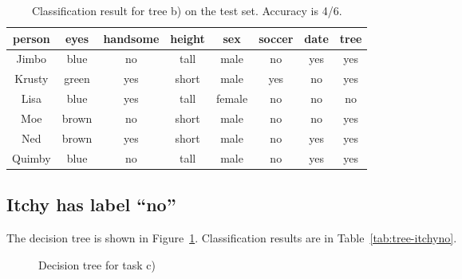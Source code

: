 \begin{table}[h!]
  \centering
  \begin{tabular}{cccccc|c|c}
    \toprule
    person      & eyes  & handsome & height & sex    & soccer & date & tree\\
    \midrule
    Jimbo       & blue  & no       & tall   & male   & no     & yes & yes\\
    Krusty      & green & yes      & short  & male   & yes    & no  & yes\\
    Lisa        & blue  & yes      & tall   & female & no     & no  & no \\
    Moe         & brown & no       & short  & male   & no     & no  & yes\\
    Ned         & brown & yes      & short  & male   & no     & yes & yes\\
    Quimby      & blue  & no       & tall   & male   & no     & yes & yes\\
    \bottomrule
  \end{tabular}
  \caption{Classification result for tree b) on the test set. Accuracy is 4/6.}
  \label{tab:tree-noeyes}
\end{table}

\subsection{Itchy has label ``no''}

The decision tree is shown in Figure~\ref{fig:tree-itchyno}.
Classification results are in Table~\ref{tab:tree-itchyno}.

\begin{figure}
\centering 
{}
\caption{Decision tree for task c)}
\label{fig:tree-itchyno}
\end{figure}

